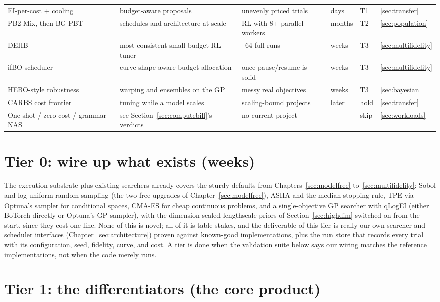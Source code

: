 \begin{table}[tp]
\begin{tabularx}{\textwidth}{@{}l>{\raggedright\arraybackslash}X>{\raggedright\arraybackslash}Xlll@{}}
EI-per-cost + cooling & budget-aware proposals & unevenly priced trials & days & T1 & \ref{sec:transfer} \\
PB2-Mix, then BG-PBT & schedules and architecture at scale & RL with 8+ parallel workers & months & T2 & \ref{sec:population} \\
DEHB & most consistent small-budget RL tuner & 10--64 full runs & weeks & T3 & \ref{sec:multifidelity} \\
ifBO scheduler & curve-shape-aware budget allocation & once pause/resume is solid & weeks & T3 & \ref{sec:multifidelity} \\
HEBO-style robustness & warping and ensembles on the GP & messy real objectives & weeks & T3 & \ref{sec:bayesian} \\
CARBS cost frontier & tuning while a model scales & scaling-bound projects & later & hold & \ref{sec:transfer} \\
One-shot / zero-cost / grammar NAS & see Section~\ref{sec:computebill}'s verdicts & no current project & --- & skip & \ref{sec:workloads} \\
\bottomrule
\end{tabularx}
\end{table}

\section{Tier 0: wire up what exists (weeks)}

The execution substrate plus existing searchers already covers the sturdy
defaults from Chapters~\ref{sec:modelfree} to~\ref{sec:multifidelity}:
Sobol and log-uniform random sampling (the two free upgrades of
Chapter~\ref{sec:modelfree}), ASHA and the median stopping rule, TPE via
Optuna's sampler for conditional spaces, CMA-ES for cheap continuous
problems, and a single-objective GP searcher with qLogEI (either BoTorch
directly or Optuna's GP sampler), with the dimension-scaled lengthscale
priors of Section~\ref{sec:highdim} switched on from the start, since
they cost one line. None of this is novel; all of it is table stakes,
and the deliverable of this tier is really our own searcher and
scheduler interfaces (Chapter~\ref{sec:architecture}) proven against
known-good implementations, plus the run store that records every trial
with its configuration, seed, fidelity, curve, and cost. A tier is done
when the validation suite below says our wiring matches the reference
implementations, not when the code merely runs.

\section{Tier 1: the differentiators (the core product)}

